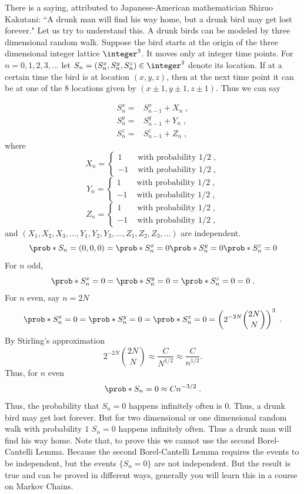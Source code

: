 \begin{exercise}[subtitle={Drunk Men and Drunk Birds}]

There is a saying, attributed to  Japanese-American mathematician Shizuo
Kakutani: ``A drunk man will find his way home, but a drunk bird may get lost
forever." Let us try to understand this. A drunk birds can be modeled by three
dimensional random walk. Suppose the bird starts at the origin of the three
dimensional integer lattice $\integer^3$. It moves only at integer time points. For
$n=0,1,2,3,\ldots$ let $S_n=(S_n^x,S_n^y,S_n^z)\in\integer^3$ denote its location.
If at a certain time the bird is at location $(x,y,z)$, then at the next time
point it can be at one of the $8$ locations given by $(x\pm 1,y\pm 1,z\pm 1)$.
Thus we can say

\begin{align*}
S_n^x ={} & S_{n-1}^x + X_n\;,\\
S_n^y ={} & S_{n-1}^y + Y_n\;,\\
S_n^z ={} & S_{n-1}^z + Z_n\;,
\end{align*}
where
\[
X_n = \begin{cases}
1 & \mbox{ with probability } 1/2\;,\\
-1 & \mbox{ with probability } 1/2\;,
\end{cases}
\]
\[
Y_n = \begin{cases}
1 & \mbox{ with probability } 1/2\;,\\
-1 & \mbox{ with probability } 1/2\;,
\end{cases}
\]
\[
Z_n = \begin{cases}
1 & \mbox{ with probability } 1/2\;,\\
-1 & \mbox{ with probability } 1/2\;,
\end{cases}
\]
and $(X_1,X_2,X_3,\ldots,Y_1,Y_2,Y_3,\ldots,Z_1,Z_2,Z_3,\ldots)$ are independent.
\[
\prob*{S_n=(0,0,0)} 
= \prob*{S_n^x=0}\prob*{S_n^y=0}\prob*{S_n^z=0}
\]
For $n$ odd, 
\[
\prob*{S_n^x=0}=
\prob*{S_n^y=0}=
\prob*{S_n^z=0}=0\;.
\]
For $n$ even, say $n=2N$
\[
\prob*{S_n^x=0}=
\prob*{S_n^y=0}=
\prob*{S_n^z=0}=\left(2^{-2N}\binom{2N}{N}\right)^3\;.
\]
By Stirling's approximation
\[
2^{-2N}\binom{2N}{N} \approx \frac{C}{N^{1/2}} 
\approx \frac{C}{n^{1/2}}.
\]
Thus, for $n$ even
\[
\prob*{S_n=0} \approx C n^{-3/2}\;.
\]
Thus, the probability that $S_n=0$ happens infinitely often is $0$. Thus, a
drunk bird may get lost forever. But for two dimensional or one dimensional
random walk with probability $1$ $S_n=0$ happens infinitely often. Thus a drunk
man will find his way home. Note that, to prove this we cannot use the second
Borel-Cantelli Lemma. Because the second Borel-Cantelli Lemma requires the
events to be independent, but the events $\{S_n=0\}$ are not independent. But
the result is true and can be proved in different ways, generally you will learn
this in a course on Markov Chains.

\end{exercise}
